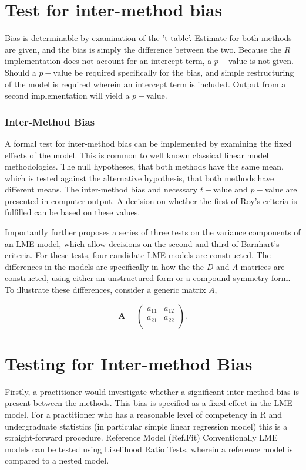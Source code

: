 \documentclass[12pt, a4paper]{report}
\theoremstyle{plain}
\theoremstyle{definition}
\theoremstyle{remark}
\begin{document}
\section{Test for inter-method bias}
Bias is determinable by examination of the 't-table'. Estimate for both methods are given, and the bias is simply the difference between the two. Because the $R$ implementation does not account for an intercept term, a $p-$value is not given. Should a $p-$value be required specifically for the bias, and simple restructuring of the model is required wherein an intercept term is included. Output from a second implementation will yield a $p-$value.
	\subsubsection{Inter-Method Bias}
	
	
	A formal test for inter-method bias can be implemented by examining the fixed effects of the model. This is common to well known classical linear model methodologies. The null hypotheses, that both methods have the same mean, which is tested against the alternative hypothesis, that both methods have different means.
	The inter-method bias and necessary $t-$value and $p-$value are presented in computer output. A decision on whether the first of Roy's criteria is fulfilled can be based on these values.
	
	Importantly \citet{ARoy2009} further proposes a series of three tests on the variance components of an LME model, which allow decisions on the second and third of Barnhart's criteria. For these tests, four candidate LME models are constructed. The differences in the models are specifically in how the the $D$ and $\Lambda$ matrices are constructed, using either an unstructured form or a compound symmetry form. To illustrate these differences, consider a generic matrix $A$,
	
	\[
	\boldsymbol{A} = \left( \begin{array}{cc}
	a_{11} & a_{12}  \\
	a_{21} & a_{22}  \\
	\end{array}\right).
	\]
	
	
	
	
	
\section{Testing for Inter-method Bias}
	Firstly, a practitioner would investigate whether a significant inter-method bias is present between the methods. This bias is specified as a fixed effect in the LME model.  For a practitioner who has a reasonable level of competency in R and undergraduate statistics (in particular simple linear regression model) this is a straight-forward procedure.
	Reference Model (Ref.Fit)
	Conventionally LME models can be tested using Likelihood Ratio Tests, wherein a reference model is compared to a nested model.
	
\end{document}
